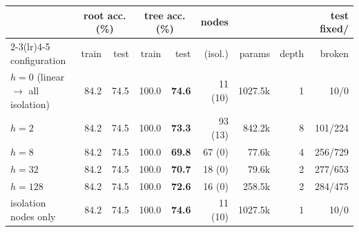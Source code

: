 \begin{tabular}{@{}lrrrrrrrr@{}}\toprule
 & \multicolumn{2}{c}{root acc. (\%)} & \multicolumn{2}{c}{tree acc. (\%)} & nodes & & & test fixed/\\
\cmidrule(lr){2-3}\cmidrule(lr){4-5}
configuration & train & test & train & test & (isol.) & params & depth & broken\\\midrule
$h=0$ (linear $\to$ all isolation) & 84.2 & 74.5 & 100.0 & \textbf{74.6} & 11 (10) & 1027.5k & 1 & 10/0\\
$h=2$ & 84.2 & 74.5 & 100.0 & \textbf{73.3} & 93 (13) & 842.2k & 8 & 101/224\\
$h=8$ & 84.2 & 74.5 & 100.0 & \textbf{69.8} & 67 (0) & 77.6k & 4 & 256/729\\
$h=32$ & 84.2 & 74.5 & 100.0 & \textbf{70.7} & 18 (0) & 79.6k & 2 & 277/653\\
$h=128$ & 84.2 & 74.5 & 100.0 & \textbf{72.6} & 16 (0) & 258.5k & 2 & 284/475\\
isolation nodes only & 84.2 & 74.5 & 100.0 & \textbf{74.6} & 11 (10) & 1027.5k & 1 & 10/0\\
\bottomrule\end{tabular}
